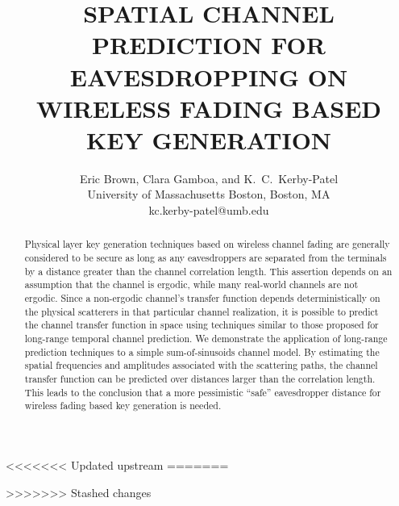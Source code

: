 \documentclass{allertonproc}
\title{SPATIAL CHANNEL PREDICTION FOR EAVESDROPPING ON WIRELESS FADING BASED KEY GENERATION}
\date{}
\author{Eric Brown, Clara Gamboa, and K.~C.~Kerby-Patel\\University of Massachusetts Boston, Boston, MA\\kc.kerby-patel@umb.edu}
\begin{document}
\maketitle
<<<<<<< Updated upstream
\abstract{
}
=======
\begin{abstract}

Physical layer key generation techniques based on wireless channel fading are generally considered to be secure as long as any eavesdroppers are separated from the terminals by a distance greater than the channel correlation length.  This assertion depends on an assumption that the channel is ergodic, while many real-world channels are not ergodic.  Since a non-ergodic channel's transfer function depends deterministically on the physical scatterers in that particular channel realization, it is possible to predict the channel transfer function in space using techniques similar to those proposed for long-range temporal channel prediction.  We demonstrate the application of long-range prediction techniques to a simple sum-of-sinusoids channel model.  By estimating the spatial frequencies and amplitudes associated with the scattering paths, the channel transfer function can be predicted over distances larger than the correlation length.  This leads to the conclusion that a more pessimistic ``safe'' eavesdropper distance for wireless fading based key generation is needed.
\end{abstract}
>>>>>>> Stashed changes
\end{document}
